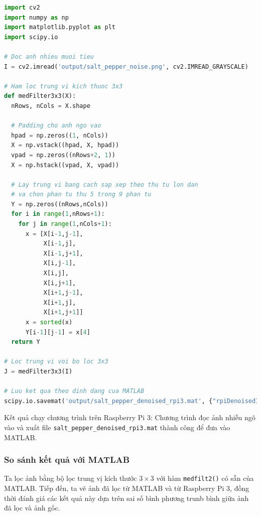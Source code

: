 \begin{lstlisting}[language=Python]
import cv2
import numpy as np
import matplotlib.pyplot as plt
import scipy.io

# Doc anh nhieu muoi tieu
I = cv2.imread('output/salt_pepper_noise.png', cv2.IMREAD_GRAYSCALE)

# Ham loc trung vi kich thuoc 3x3
def medFilter3x3(X):
  nRows, nCols = X.shape

  # Padding cho anh ngo vao
  hpad = np.zeros((1, nCols))
  X = np.vstack((hpad, X, hpad))
  vpad = np.zeros((nRows+2, 1))
  X = np.hstack((vpad, X, vpad))
  
  # Lay trung vi bang cach sap xep theo thu tu lon dan
  # va chon phan tu thu 5 trong 9 phan tu
  Y = np.zeros((nRows,nCols))
  for i in range(1,nRows+1):
    for j in range(1,nCols+1):
      x = [X[i-1,j-1],
           X[i-1,j],
           X[i-1,j+1],
           X[i,j-1],
           X[i,j],
           X[i,j+1],
           X[i+1,j-1],
           X[i+1,j],
           X[i+1,j+1]]
      x = sorted(x)
      Y[i-1][j-1] = x[4]
  return Y

# Loc trung vi voi bo loc 3x3
J = medFilter3x3(I)

# Luu ket qua theo dinh dang cua MATLAB
scipy.io.savemat('output/salt_pepper_denoised_rpi3.mat', {"rpiDenoisedImg": J})
\end{lstlisting}

Kết quả chạy chương trình trên Raspberry Pi 3: 
Chương trình đọc ảnh nhiễu ngõ vào và xuất file \verb|salt_pepper_denoised_rpi3.mat| thành công để đưa vào MATLAB.

\subsubsection{So sánh kết quả với MATLAB}

Ta lọc ảnh bằng bộ lọc trung vị kích thước $3 \times 3$ với hàm \texttt{medfilt2()} có sẵn của MATLAB. 
Tiếp đến, ta vẽ ảnh đã lọc từ MATLAB và từ Raspberry Pi 3, 
đồng thời đánh giá các kết quả này dựa trên sai số bình phương trunb bình giữa ảnh đã lọc và ảnh gốc.

